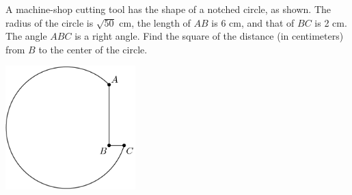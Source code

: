 A machine-shop cutting tool has the shape of a notched circle, as shown.  The radius of the circle is $\sqrt{50}$ cm, the length of $AB$ is 6 cm, and that of $BC$ is 2 cm.  The angle $ABC$ is a right angle.  Find the square of the distance (in centimeters) from $B$ to the center of the circle.
\begin{center}
\includegraphics[width = 50.400000000000006mm]{img/fig0.png}
\end{center}